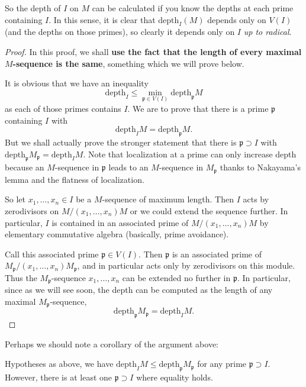 So the depth of $I$ on $M$ can be calculated  if you know the depths at each
prime containing $I$. In this sense, it is clear that $\mathrm{depth}_I (M)$ depends
only on $V(I)$ (and the depths on those primes), so clearly it depends only on
$I$ \emph{up to radical}.

\begin{proof} 
In this proof, we shall \textbf{use the fact that the length of every maximal
$M$-sequence is the same}, something which we will prove below.

It is obvious that we have an inequality
\[ \mathrm{depth}_I \leq  \min_{\mathfrak{p} \in V(I)} \mathrm{depth}_{\mathfrak{p}} M \]
as each of those primes contains $I$. 
We are to prove that there is 
a prime $\mathfrak{p}$ containing $I$ with
\[ \mathrm{depth}_I M = \mathrm{depth}_{\mathfrak{p}} M . \]
But we shall actually prove the stronger statement that there is $\mathfrak{p}
\supset I$ with $\mathrm{depth}_{\mathfrak{p}} M_{\mathfrak{p}} = \mathrm{depth}_I M$. Note
that localization at a prime can only increase depth because an $M$-sequence in
$\mathfrak{p}$ leads to an $M$-sequence in $M_{\mathfrak{p}}$ thanks to
Nakayama's lemma and the flatness of localization.

So let $x_1, \dots, x_n \in I$ be a $M$-sequence of maximum length. Then $I$
acts by zerodivisors on 
$M/(x_1 , \dots, x_n) M$ or we could extend the sequence further. 
In particular, $I$ is contained in an associated prime of $M/(x_1, \dots, x_n)
M$ by elementary commutative algebra (basically, prime avoidance).

Call this associated prime $\mathfrak{p} \in V(I)$. Then $\mathfrak{p}$ is an
associated prime of $M_{\mathfrak{p}}/(x_1, \dots, x_n) M_{\mathfrak{p}}$,
and in particular acts only by zerodivisors on this module. 
Thus the $M_{\mathfrak{p}}$-sequence $x_1, \dots, x_n$ can be extended no
further in $\mathfrak{p}$. In particular, since as we will see soon, the depth
can be computed as the length of any maximal $M_{\mathfrak{p}}$-sequence,
\[ \mathrm{depth}_{\mathfrak{p}} M_{\mathfrak{p}} = \mathrm{depth}_I M. \]
\end{proof} 

Perhaps we should note a corollary of the argument above:
\begin{corollary} 
Hypotheses as above, we have $\mathrm{depth}_I M  \leq \mathrm{depth}_\mathfrak{p} M_{\mathfrak{p}}$ for
any prime $\mathfrak{p} \supset I$. However, there is at least one $\mathfrak{p}
\supset I$ where equality holds. \end{corollary}

